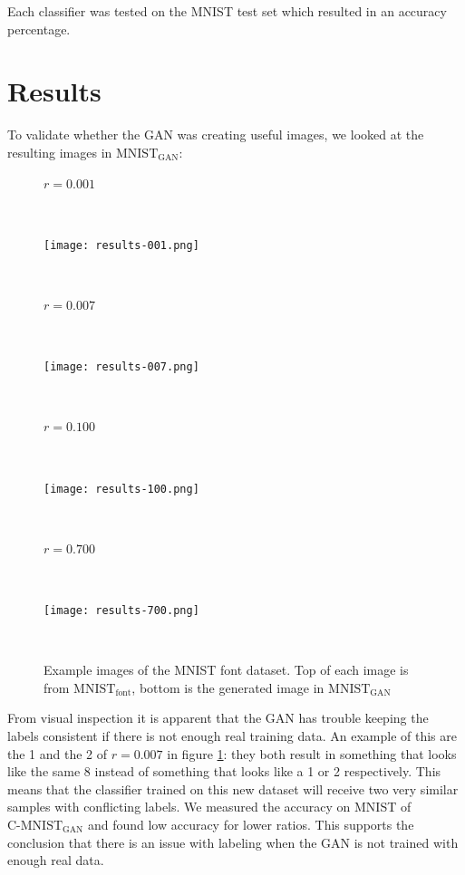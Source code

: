\documentclass[10pt,twocolumn,letterpaper]{article}
\begin{document}
Each classifier was tested on the MNIST test set which resulted in an accuracy percentage.

\section{Results}

To validate whether the GAN was creating useful images, we looked at the resulting images in $\text{MNIST}_\text{GAN}$:

\begin{figure}[h]
\begin{center}
	\parbox{0.7\linewidth}{ \small $r = 0.001$ } \\
	\parbox{0.7\linewidth}{ \texttt{[image: results-001.png]} } \\
	\parbox{0.7\linewidth}{ \small $r = 0.007$ } \\
	\parbox{0.7\linewidth}{ \texttt{[image: results-007.png]} } \\
	\parbox{0.7\linewidth}{ \small $r = 0.100$ } \\
	\parbox{0.7\linewidth}{ \texttt{[image: results-100.png]} } \\
	\parbox{0.7\linewidth}{ \small $r = 0.700$ } \\
	\parbox{0.7\linewidth}{ \texttt{[image: results-700.png]} } \\
\end{center}
   \caption{Example images of the MNIST font dataset. Top of each image is from $\text{MNIST}_\text{font}$, bottom is the generated image in $\text{MNIST}_\text{GAN}$ }
\label{fig:results}
\end{figure}

From visual inspection it is apparent that the GAN has trouble keeping the labels consistent if there is not enough real training data. An example of this are the 1 and the 2 of $r = 0.007$ in figure \ref{fig:results}: they both result in something that looks like the same 8 instead of something that looks like a 1 or 2 respectively. This means that the classifier trained on this new dataset will receive two very similar samples with conflicting labels. We measured the accuracy on MNIST of $\text{C-MNIST}_\text{GAN}$ and found low accuracy for lower ratios. This supports the conclusion that there is an issue with labeling when the GAN is not trained with enough real data.
\end{document}

